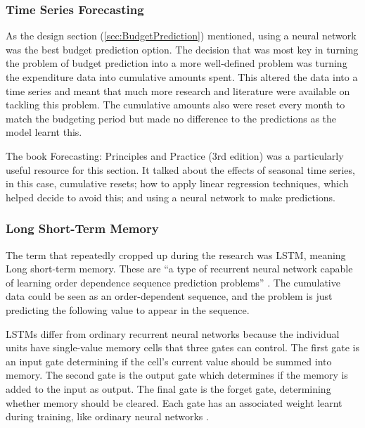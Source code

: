 \subsubsection{Time Series Forecasting}
As the design section (\ref{sec:BudgetPrediction}) mentioned, using a neural network was the best budget prediction option. The decision that was most key in turning the problem of budget prediction into a more well-defined problem was turning the expenditure data into cumulative amounts spent. This altered the data into a time series and meant that much more research and literature were available on tackling this problem. The cumulative amounts also were reset every month to match the budgeting period but made no difference to the predictions as the model learnt this.

The book Forecasting: Principles and Practice (3rd edition) \cite{ForecastingPrinciplesPractice} was a particularly useful resource for this section. It talked about the effects of seasonal time series, in this case, cumulative resets; how to apply linear regression techniques, which helped decide to avoid this; and using a neural network to make predictions.

\subsubsection{Long Short-Term Memory}
The term that repeatedly cropped up during the research was LSTM, meaning Long short-term memory. These are ``a type of recurrent neural network capable of learning order dependence sequence prediction problems'' \cite{LSTMGentleIntro}. The cumulative data could be seen as an order-dependent sequence, and the problem is just predicting the following value to appear in the sequence.

LSTMs differ from ordinary recurrent neural networks because the individual units have single-value memory cells that three gates can control. The first gate is an input gate determining if the cell's current value should be summed into memory. The second gate is the output gate which determines if the memory is added to the input as output. The final gate is the forget gate, determining whether memory should be cleared. Each gate has an associated weight learnt during training, like ordinary neural networks \cite{LSTMBig}.

\newpage
